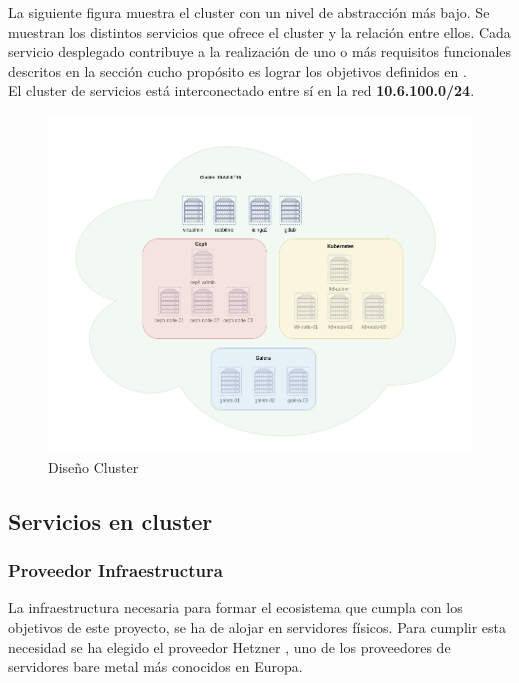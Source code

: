 \begin{text}
	La siguiente figura muestra el cluster con un nivel de abstracción más bajo. Se muestran los distintos servicios que ofrece el cluster y la relación entre ellos. Cada servicio desplegado contribuye a la realización de uno o más requisitos funcionales descritos en la sección  cucho propósito es lograr los objetivos definidos en . \\
	El cluster de servicios está interconectado entre sí en la red \textbf{10.6.100.0/24}.
\end{text}
\begin{figure}[!hbt]
	\centering
	\includegraphics[scale=0.40]{imagenes/Diseno/diagrama_cluster_2.png}
	\caption[Diseño Cluster]{Diseño Cluster} 
	\label{cluster_design}
\end{figure}

\subsection{Servicios en cluster}

\subsubsection{Proveedor Infraestructura}
\begin{text}
	La infraestructura necesaria para formar el ecosistema que cumpla con los objetivos de este proyecto, se ha de alojar en servidores físicos. Para cumplir esta necesidad se ha elegido el proveedor Hetzner \cite{hetzner:online}, uno de los proveedores de servidores bare metal más conocidos en Europa. \\
\end{text}

